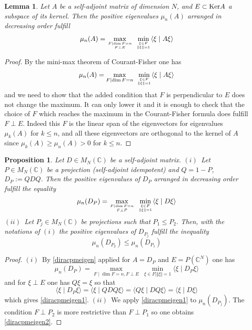 \documentclass[cupthm]{CUP-JNL-JMJ}
\def\C{{\mathbb C}}
\def\Qer{{\rm Ker}}
\numberwithin{equation}{section}
\theoremstyle{cupplain}
\newtheorem{lemma}[theorem]{Lemma}
\newtheorem{proposition}[theorem]{Proposition}
\theoremstyle{cupdefinition}
\theoremstyle{cupremark}
\theoremstyle{cupproof}
\newtheorem{proof}{Proof}
\begin{document}
  \begin{lemma}\label{diracpm2} Let $A$ be a self-adjoint matrix of dimension $N$, and $E\subset \Qer A$ a subspace of its kernel. Then the positive eigenvalues $\mu_n(A)$ arranged in decreasing order fulfill
 \begin{equation}\label{diracpmeigen}
  \mu_n(A)=\max_{F\mid \dim F=n\atop F\perp E} \ \min_{\xi \in F\atop \Vert \xi\Vert=1}\langle \xi \mid A \xi\rangle
\end{equation} 	
  \end{lemma}
  \begin{proof} By the mini-max theorem of Courant-Fisher one has 
  $$
  \mu_n(A)=\max_{F\mid \dim F=n} \ \min_{\xi \in F\atop \Vert \xi\Vert=1}\langle \xi \mid A \xi\rangle
  $$ 
and we need to show that the added condition that $F$ is perpendicular to $E$ does not change the maximum. It can only lower it and it is enough to check that the choice of $F$ which reaches the maximum in the Courant-Fisher formula does fulfill $F\perp E$. Indeed this $F$ is the linear span of the eigenvectors for eigenvalues $\mu_k(A)$ for $k\leq n$, and all these eigenvectors are orthogonal to the kernel of $A$ since $\mu_k(A)\geq \mu_n(A)>0$ for $k\leq n$. \end{proof} 



\begin{proposition}\label{diracpm3}Let $D\in M_N(\C)$ be a self-adjoint matrix.\newline
$(i)$~Let $P\in M_N(\C)$ be a projection (self-adjoint idempotent) and $Q=1-P$, $D_P:=QDQ$. Then the positive eigenvalues of $D_P$ arranged in decreasing order fulfill the equality
 \begin{equation}\label{diracpmeigen1}
  \mu_n(D_P)=\max_{F\mid \dim F=n \atop F\perp P} \ \min_{\xi \in F \atop \Vert \xi\Vert=1}\langle \xi \mid D\xi\rangle
  \end{equation}
$(ii)$~Let $P_j\in M_N(\C)$	be projections such that $P_1\leq P_2$. Then, with the notations of $(i)$ the positive eigenvalues of  $D_{P_j}$ fulfill the inequality
\begin{equation}\label{diracpmeigen2}
\mu_n(D_{P_2})\leq \mu_n(D_{P_1})
 \end{equation}
\end{proposition}
\begin{proof}$(i)$~By \eqref{diracpmeigen} applied for $A=D_P$ and $E=P(\C^N)$ one has 
$$
\mu_n(D_P)=\max_{F\mid \dim F=n,F\perp E} \ \min_{\xi \in F\mid \Vert \xi\Vert=1}\langle \xi \mid D_P \xi\rangle
$$
and for $\xi\perp E$ one has $Q\xi=\xi$ so that
$$
\langle \xi \mid D_P \xi\rangle=\langle \xi \mid Q D Q \xi\rangle=\langle Q\xi \mid D Q \xi\rangle=\langle \xi \mid D\xi\rangle
$$
 which gives \eqref{diracpmeigen1}.\newline
 $(ii)$~We apply \eqref{diracpmeigen1} to  $\mu_n(D_{P_j})$. The condition $F\perp P_2$ is more restrictive than $F\perp P_1$ so one obtains \eqref{diracpmeigen2}.\end{proof} 
 
\end{document}
